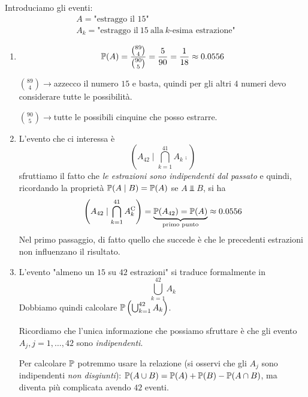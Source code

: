 Introduciamo gli eventi:
\begin{gather*}
	A=\text{"estraggo il 15"}\\
	A_{k} =\text{"estraggo il} \ 15\ \text{alla} \ k\text{-esima estrazione"}
\end{gather*}
\begin{enumerate}
	\item
	\begin{equation*}
		\mathbb{P}(A) =\frac{\binom{89}{4}}{\binom{90}{5}} =\frac{5}{90} =\frac{1}{18} \approx 0.0556
	\end{equation*}

	$\binom{89}{4}\rightarrow $azzecco il numero $15$ e basta, quindi per gli altri $4$ numeri devo considerare tutte le possibilità.

	$\binom{90}{5}\rightarrow $tutte le possibili cinquine che posso estrarre.
	\item L'evento che ci interessa è
	\begin{equation*}
		\left(A_{42} \mid \bigcap _{k=1}^{41} A_{k}\comp\right)
	\end{equation*}
	sfruttiamo il fatto che \textit{le estrazioni sono indipendenti dal passato} e quindi, ricordando la proprietà $\mathbb{P}(A\mid B) =\mathbb{P}(A)$ se $A\Bot B$, si ha
	\begin{equation*}
		\left(A_{42} \mid\bigcap _{k=1}^{41} A_{k}^{\mathrm{C}}\right) =\underbrace{\mathbb{P}(A_{42}) =\mathbb{P}(A)}_{\text{primo punto}} \approx 0.0556
	\end{equation*}
	Nel primo passaggio, di fatto quello che succede è che le precedenti estrazioni non influenzano il risultato.
	\item L'evento "almeno un $15$ su $42$ estrazioni" si traduce formalmente in
	\begin{equation*}
		\bigcup _{k=1}^{42} A_{k}
	\end{equation*}
	Dobbiamo quindi calcolare $\mathbb{P}\left(\bigcup _{k=1}^{42} A_{k}\right)$.

	Ricordiamo che l'unica informazione che possiamo sfruttare è che gli evento $A_{j} ,j=1,\dots,42$ sono \textit{indipendenti}.

	Per calcolare $\mathbb{P}$ potremmo usare la relazione (si osservi che gli $A_{j}$ sono indipendenti \textit{non disgiunti}): $\mathbb{P}(A\cup B) =\mathbb{P}(A) +\mathbb{P}(B) -\mathbb{P}(A\cap B)$, ma diventa più complicata avendo $42$ eventi.


\end{enumerate}
